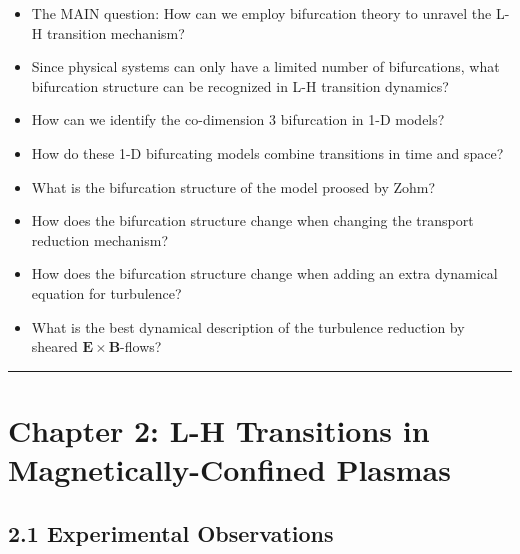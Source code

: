\documentclass[a4paper]{article}
\begin{document}
\begin{itemize}
\item
  The MAIN question: How can we employ bifurcation theory to unravel the
  L-H transition mechanism?
\item
  Since physical systems can only have a limited number of bifurcations,
  what bifurcation structure can be recognized in L-H transition
  dynamics?
\item
  How can we identify the co-dimension 3 bifurcation in 1-D models?
\item
  How do these 1-D bifurcating models combine transitions in time and
  space?
\item
  What is the bifurcation structure of the model proosed by Zohm?
\item
  How does the bifurcation structure change when changing the transport
  reduction mechanism?
\item
  How does the bifurcation structure change when adding an extra
  dynamical equation for turbulence?
\item
  What is the best
  dynamical description of the turbulence reduction by sheared
  $\mathbf{E}\times\mathbf{B}$-flows?
\end{itemize}

\begin{center}\rule{3in}{0.4pt}\end{center}

\section{Chapter 2: L-H Transitions in Magnetically-Confined
Plasmas}\label{chapter-2-l-h-transitions-in-magnetically-confined-plasmas}

\subsection{2.1 Experimental
Observations}\label{experimental-observations}
\end{document}
